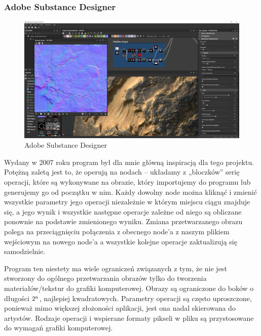 \subsubsection{Adobe Substance Designer}
\begin{figure}[H]
    \centering
    \includegraphics{./images/Picture6.jpg}
    \caption{Adobe Substance Designer}
    \label{fig:designer}
\end{figure}
Wydany w 2007 roku program był dla mnie główną inspiracją dla tego projektu. 
Potężną zaletą jest to, że operują na nodach – układamy z „bloczków” serię operacji, które są wykonywane na obrazie, który importujemy do programu lub generujemy go od początku w nim. Każdy dowolny node można kliknąć i zmienić wszystkie parametry jego operacji niezależnie w którym miejscu ciągu znajduje się, a jego wynik i wszystkie następne operacje zależne od niego są obliczane ponownie na podstawie zmienionego wyniku. 
Zmiana przetwarzanego obrazu polega na przeciągnięciu połączenia z obecnego node’a z naszym plikiem wejściowym na nowego node’a a wszystkie kolejne operacje zaktualizują się samodzielnie.

Program ten niestety ma wiele ograniczeń związanych z tym, że nie jest stworzony do ogólnego przetwarzania obrazów tylko do tworzenia materiałów/tekstur do grafiki komputerowej. 
Obrazy są ograniczone do boków o długości $2\textsuperscript{n}$, najlepiej kwadratowych. 
Parametry operacji są często uproszczone, ponieważ mimo większej złożoności aplikacji, jest ona nadal skierowana do artystów. 
Rodzaje operacji i wspierane formaty pikseli w pliku są przystosowane do wymagań grafiki komputerowej.

